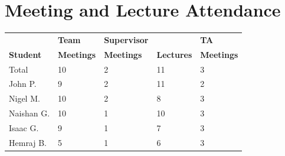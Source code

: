 \documentclass{article}
\begin{document}
\newpage
\section{Meeting and Lecture Attendance}





\begin{table}[H]
\centering
\begin{tabular}{lllll}
\toprule
\textbf{ } & \textbf{Team} & \textbf{Supervisor} & \textbf{ } & \textbf{TA}\\
\textbf{Student} & \textbf{Meetings} & \textbf{Meetings} & \textbf{Lectures} & \textbf{Meetings}\\
\midrule
Total & 10 & 2 & 11 & 3\\
\midrule
John P. & 9 & 2 & 11 & 2\\
Nigel M. & 10 & 2 & 8 & 3\\
Naishan G. & 10 & 1 & 10 & 3\\
Isaac G. & 9 & 1 & 7 & 3\\
Hemraj B. & 5 & 1 & 6 & 3\\
\bottomrule
\end{tabular}
\end{table}

\end{document}
